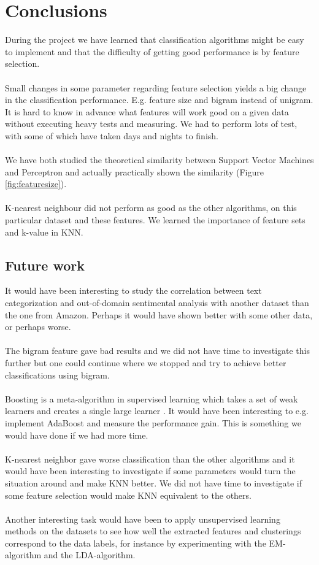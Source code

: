 \chapter{Conclusions}
During the project we have learned that classification algorithms might be easy to implement and that the difficulty of getting good performance is by feature selection. \\\\
Small changes in some parameter regarding feature selection yields a big change in the classification performance. E.g. feature size and bigram instead of unigram. It is hard to know in advance what features will work good on a given data without executing heavy tests and measuring. We had to perform lots of test, with some of which have taken days and nights to finish.
\\\\
We have both studied the theoretical similarity between Support Vector Machines and Perceptron and actually practically shown the similarity (Figure \ref{fig:featuresize}).
\\\\
K-nearest neighbour did not perform as good as the other algorithms, on this particular dataset and these features. We learned the importance of feature sets and k-value in KNN.
\section{Future work}
It would have been interesting to study the correlation between text categorization and out-of-domain sentimental analysis with another dataset than the one from Amazon. Perhaps it would have shown better with some other data, or perhaps worse. \\\\
The bigram feature gave bad results and we did not have time to investigate this further but one could continue where we stopped and try to achieve better classifications using bigram. \\\\
Boosting is a meta-algorithm in supervised learning which takes a set of weak learners and creates a single large learner \citep{boosting}. It would have been interesting to e.g. implement AdaBoost and measure the performance gain. This is something we would have done if we had more time. \\\\
K-nearest neighbor gave worse classification than the other algorithms and it would have been interesting to investigate if some parameters would turn the situation around and make KNN better. We did not have time to investigate if some feature selection would make KNN equivalent to the others.
\\\\
Another interesting task would have been to apply unsupervised learning methods on the datasets to see how well the extracted features and clusterings correspond to the data labels, for instance by experimenting with the EM-algorithm and the LDA-algorithm.
